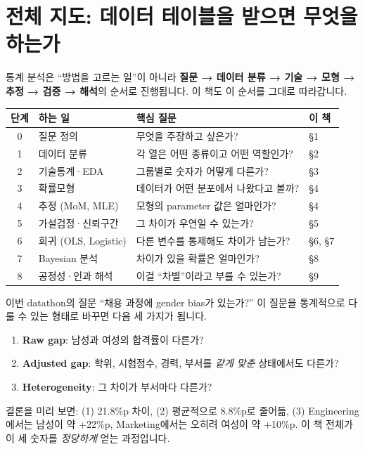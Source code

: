 \documentclass[11pt,a4paper]{article}
\begin{document}
\section{전체 지도: 데이터 테이블을 받으면 무엇을 하는가}

통계 분석은 ``방법을 고르는 일''이 아니라 \textbf{질문 → 데이터 분류 → 기술 → 모형 → 추정 → 검증 → 해석}의 순서로 진행됩니다. 이 책도 이 순서를 그대로 따라갑니다.

\begin{center}
\begin{tabular}{@{}c l l l@{}}
\toprule
단계 & 하는 일 & 핵심 질문 & 이 책 \\
\midrule
0 & 질문 정의 & 무엇을 주장하고 싶은가? & \S1 \\
1 & 데이터 분류 & 각 열은 어떤 종류이고 어떤 역할인가? & \S2 \\
2 & 기술통계·EDA & 그룹별로 숫자가 어떻게 다른가? & \S3 \\
3 & 확률모형 & 데이터가 어떤 분포에서 나왔다고 볼까? & \S4 \\
4 & 추정 (MoM, MLE) & 모형의 parameter 값은 얼마인가? & \S4 \\
5 & 가설검정·신뢰구간 & 그 차이가 우연일 수 있는가? & \S5 \\
6 & 회귀 (OLS, Logistic) & 다른 변수를 통제해도 차이가 남는가? & \S6, \S7 \\
7 & Bayesian 분석 & 차이가 있을 확률은 얼마인가? & \S8 \\
8 & 공정성·인과 해석 & 이걸 ``차별''이라고 부를 수 있는가? & \S9 \\
\bottomrule
\end{tabular}
\end{center}

\begin{databox}{이번 datathon의 질문}
``채용 과정에 gender bias가 있는가?'' 이 질문을 통계적으로 다룰 수 있는 형태로 바꾸면 다음 세 가지가 됩니다.
\begin{enumerate}
\item \textbf{Raw gap}: 남성과 여성의 합격률이 다른가?
\item \textbf{Adjusted gap}: 학위, 시험점수, 경력, 부서를 \emph{같게 맞춘} 상태에서도 다른가?
\item \textbf{Heterogeneity}: 그 차이가 부서마다 다른가?
\end{enumerate}
결론을 미리 보면: (1) 21.8\%p 차이, (2) 평균적으로 8.8\%p로 줄어듦, (3) Engineering에서는 남성이 약 +22\%p, Marketing에서는 오히려 여성이 약 +10\%p. 이 책 전체가 이 세 숫자를 \emph{정당하게} 얻는 과정입니다.
\end{databox}
\end{document}
